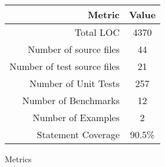 \begin{figure}[H]
    \centering
    \small
    \begin{tabular}{r c}
        \toprule
        \textbf{Metric} & \textbf{Value} \\
        \midrule
        Total LOC                      & 4370 \\
        Number of source files         & 44 \\
        Number of test source files    & 21 \\
        Number of Unit Tests           & 257 \\
        Number of Benchmarks           & 12 \\
        Number of Examples             & 2 \\
        Statement Coverage             & 90.5\% \\
        \bottomrule
    \end{tabular}
    \caption{Metrics}\label{fig:test_metrics}
\end{figure}